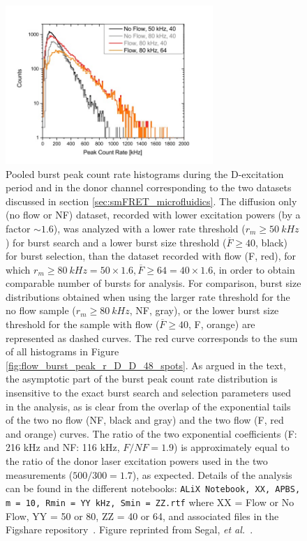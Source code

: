 \begin{figure}
\centering
\includegraphics[width=0.7\textwidth]{chapters/figures/pooled_burst_peak_r_D_D.jpg}
\caption{\label{fig:pooled_burst_peak_r_D_D}
Pooled burst peak count rate histograms during the D-excitation period and in the donor channel corresponding to the two datasets discussed in section \ref{sec:smFRET_microfluidics}.
The diffusion only (no flow or NF) dataset, recorded with lower excitation powers (by a factor $\sim1.6$), was analyzed with a lower rate threshold ($r_m \geq 50~kHz$) for burst search and a lower burst size threshold ($\overline{F} \geq 40$, black) for burst selection, than the dataset recorded with flow (F, red), for which $r_m \geq 80~kHz = 50 \times 1.6, \overline{F} \geq 64 = 40 \times 1.6$, in order to obtain comparable number of bursts for analysis.
For comparison, burst size distributions obtained when using the larger rate threshold for the no flow sample  ($r_m \geq 80~kHz$, NF, gray), or the lower burst size threshold for the sample with flow ($\overline{F} \geq 40$, F, orange) are represented as dashed curves. 
The red curve corresponds to the sum of all histograms in
Figure \ref{fig:flow_burst_peak_r_D_D_48_spots}.
As argued in the text, the asymptotic part of the burst peak count rate distribution is insensitive to the exact burst search and selection parameters used in the analysis, as is clear from the overlap of the exponential tails of the two no flow (NF, black and gray) and the two flow (F, red and orange) curves.
The ratio of the two exponential coefficients (F: 216 kHz and NF: 116 kHz, $F/NF = 1.9$) is approximately equal to the ratio of the donor laser  excitation powers used in the two measurements ($500/300 = 1.7$), as expected.
Details of the analysis can be found in the different notebooks:
\texttt{ALiX Notebook, XX, \ac{APBS}, m = 10, Rmin = YY kHz, Smin = ZZ.rtf} where XX = Flow or No Flow, YY = 50 or 80, ZZ = 40 or 64, and associated files in the Figshare repository~\cite{figshare_repo_2019}.
Figure reprinted from Segal, \textit{et al.}~\cite{segal_methods_2019}.
}
\end{figure}

